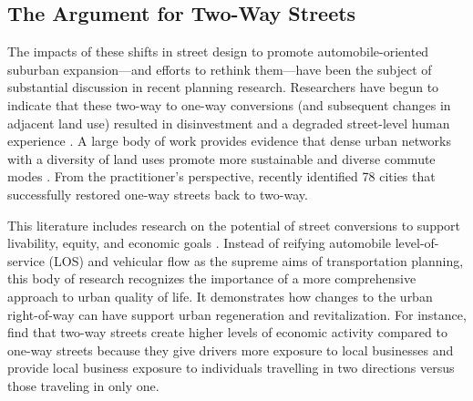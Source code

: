 \documentclass{trbunofficial}
\begin{document}
\subsection{The Argument for Two-Way Streets}

The impacts of these shifts in street design to promote automobile-oriented suburban expansion---and efforts to rethink them---have been the subject of substantial discussion in recent planning research. Researchers have begun to indicate that these two-way to one-way conversions (and subsequent changes in adjacent land use) resulted in disinvestment and a degraded street-level human experience \cite{cervero_travel_1997,leinberger_walk_2012}. A large body of work provides evidence that dense urban networks with a diversity of land uses promote more sustainable and diverse commute modes \cite{ewing_travel_2010,frank_many_2006,frederick_commute_2018}. From the practitioner's perspective, \citet{speck_walkable_2018} recently identified 78 cities that successfully restored one-way streets back to two-way.

This literature includes research on the potential of street conversions to support livability, equity, and economic goals \cite{riggs_economic_2016,riggs_economic_2016,riggs_two-way_2015,riggs_two-way_2016, riggs_economic_2017, riggs_economic_2018}. Instead of reifying automobile level-of-service (LOS) and vehicular flow as the supreme aims of transportation planning, this body of research recognizes the importance of a more comprehensive approach to urban quality of life. It demonstrates how changes to the urban right-of-way can have support urban regeneration and revitalization. For instance, \citet{riggs_two-way_2016} find that two-way streets create higher levels of economic activity compared to one-way streets because they give drivers more exposure to local businesses and provide local business exposure to individuals travelling in two directions versus those traveling in only one.
\end{document}
